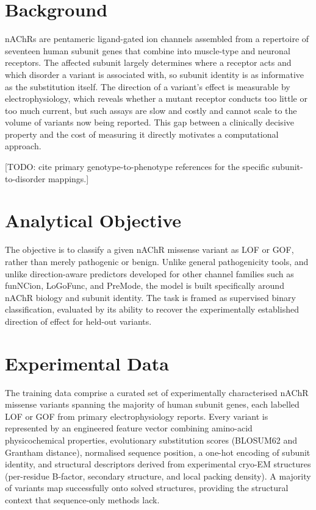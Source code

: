 \documentclass{ws-procs11x85}
\begin{document}
\section{Background}\label{sec:background}
nAChRs are pentameric ligand-gated ion channels assembled from a
repertoire of seventeen human subunit genes that combine into muscle-type
and neuronal receptors. The affected subunit largely determines where a
receptor acts and which disorder a variant is associated with, so
subunit identity is as informative as the substitution itself. The
direction of a variant's effect is measurable by electrophysiology, which
reveals whether a mutant receptor conducts too little or too much current,
but such assays are slow and costly and cannot scale to the volume of
variants now being reported. This gap between a clinically decisive
property and the cost of measuring it directly motivates a computational
approach.

[TODO: cite primary genotype-to-phenotype references for the
specific subunit-to-disorder mappings.]

\section{Analytical Objective}\label{sec:objective}
The objective is to classify a given nAChR missense variant as LOF or
GOF, rather than merely pathogenic or benign. Unlike general pathogenicity
tools, and unlike direction-aware predictors developed for other channel
families such as funNCion, LoGoFunc, and
PreMode, the model is built specifically around nAChR
biology and subunit identity. The task is framed as supervised binary
classification, evaluated by its ability to recover the experimentally
established direction of effect for held-out variants.

\section{Experimental Data}\label{sec:data}
The training data comprise a curated set of experimentally characterised
nAChR missense variants spanning the majority of human subunit genes,
each labelled LOF or GOF from primary electrophysiology
reports. Every variant is represented by an
engineered feature vector combining amino-acid physicochemical properties,
evolutionary substitution scores (BLOSUM62 and Grantham distance),
normalised sequence position, a one-hot encoding of subunit identity, and
structural descriptors derived from experimental cryo-EM structures
(per-residue B-factor, secondary structure, and local packing density).
A majority of variants map successfully onto solved structures, providing
the structural context that sequence-only methods lack. 
\end{document}
